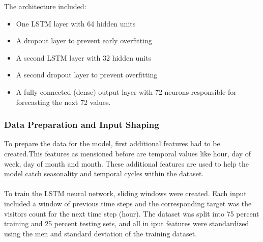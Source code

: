 \documentclass{article}
\begin{document}
The architecture included:

\begin{itemize}
    \item One LSTM layer with 64 hidden units
\end{itemize}

\begin{itemize}
    \item A dropout layer to prevent early overfitting
\end{itemize}

\begin{itemize}
    \item A second LSTM layer with 32 hidden units
\end{itemize}

\begin{itemize}
    \item A second dropout layer to prevent overfitting
\end{itemize}

\begin{itemize}
    \item A fully connected (dense) output layer with 72 neurons responsible for forecasting the next 72 values.
\end{itemize}


 \subsubsection{Data Preparation and Input Shaping}
To prepare the data for the model, first additional features had to be created.This features as mensioned before are temporal values like hour, day of week, day of month and month. These additional features are used to help the model catch seasonality and temporal cycles within the dataset.\\
\\
To train the LSTM neural network, sliding windows were created. Each input included a window of previous time steps and the corresponding target was the visitors count for the next time step (hour). The dataset was split into 75 percent training and 25 percent testing sets, and all in iput features were standardized using the men and standard deviation of the training dataset.
\end{document}
